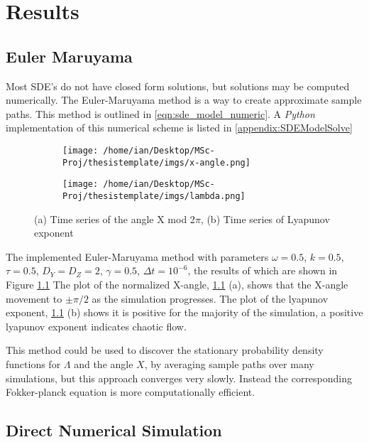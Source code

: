 \chapter{Results} \label{ch:results}
\section{Euler Maruyama} \label{sec:dns_v_fp2}

Most SDE’s do not have closed form solutions, but solutions may be computed numerically. The Euler-Maruyama method is a way to create approximate sample paths. 
This method is outlined in \ref{eqn:sde_model_numeric}. A \textit{Python} implementation of this numerical scheme is listed in \ref{appendix:SDEModelSolve}

\begin{figure}[ht]
\begin{subfigure}{.5\textwidth}
  \centering
  \texttt{[image: /home/ian/Desktop/MSc-Proj/thesistemplate/imgs/x-angle.png]}
  \caption{}
\end{subfigure}
\begin{subfigure}{.5\textwidth}
  \centering
  \texttt{[image: /home/ian/Desktop/MSc-Proj/thesistemplate/imgs/lambda.png]}
  \caption{}
\end{subfigure}
\caption{(a) Time series of the angle X mod 2$\pi$, (b) Time series of Lyapunov exponent}
\label{fig:sde-em}
\end{figure}

The implemented Euler-Maruyama method with parameters $\omega = 0.5$, $k = 0.5$, $\tau = 0.5$, $D_{Y} = D_{Z} = 2$, $\gamma = 0.5$, $\Delta t = 10^{-6}$, the results of which are shown in Figure \ref{fig:sde-em}
The plot of the normalized X-angle, \ref{fig:sde-em} (a), shows that the X-angle movement to $\pm \pi/2$ as the simulation progresses. The plot of the lyapunov exponent, \ref{fig:sde-em} (b) shows it is positive for
the majority of the simulation, a positive lyapunov exponent indicates chaotic flow.

This method could be used to discover the stationary probability density functions for $\Lambda$ and the angle $X$, by averaging sample paths over many simulations, but this approach converges very slowly. Instead 
the corresponding Fokker-planck equation is more computationally efficient.

\section{Direct Numerical Simulation} \label{sec:dns_v_fp1}

